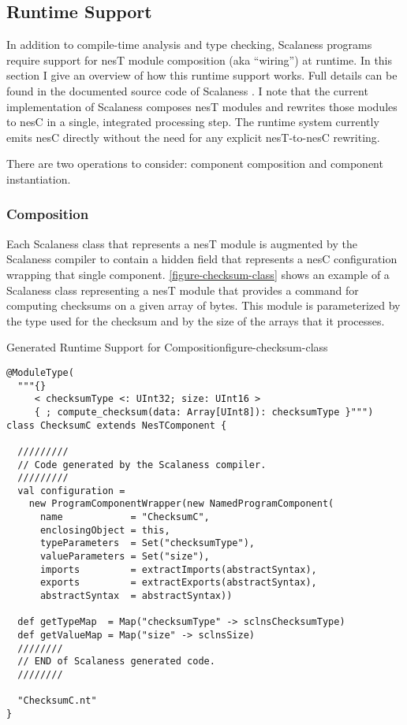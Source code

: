 
\subsection{Runtime Support}
\label{section-runtime-support}

In addition to compile-time analysis and type checking, Scalaness programs require support for
nesT module composition (aka ``wiring'') at runtime. In this section I give an overview of how
this runtime support works. Full details can be found in the documented source code of Scalaness
\cite{scalaness-home}. I note that the current implementation of Scalaness composes nesT modules
and rewrites those modules to nesC in a single, integrated processing step. The runtime system
currently emits nesC directly without the need for any explicit nesT-to-nesC rewriting.

There are two operations to consider: component composition and component instantiation.

\subsubsection{Composition}
\label{section-composition}

Each Scalaness class that represents a nesT module is augmented by the Scalaness compiler to
contain a hidden field that represents a nesC configuration wrapping that single component.
\autoref{figure-checksum-class} shows an example of a Scalaness class representing a nesT module
that provides a command for computing checksums on a given array of bytes. This module is
parameterized by the type used for the checksum and by the size of the arrays that it processes.

\singlespace
\begin{fpfig}[tbhp]{Generated Runtime Support for Composition}{figure-checksum-class}
{
\begin{lstlisting}[language=scalaness]
@ModuleType(
  """{}
     < checksumType <: UInt32; size: UInt16 >
     { ; compute_checksum(data: Array[UInt8]): checksumType }""")
class ChecksumC extends NesTComponent {

  /////////
  // Code generated by the Scalaness compiler.
  /////////
  val configuration =
    new ProgramComponentWrapper(new NamedProgramComponent(
      name            = "ChecksumC",
      enclosingObject = this,
      typeParameters  = Set("checksumType"),
      valueParameters = Set("size"),
      imports         = extractImports(abstractSyntax),
      exports         = extractExports(abstractSyntax),
      abstractSyntax  = abstractSyntax))
    
  def getTypeMap  = Map("checksumType" -> sclnsChecksumType)
  def getValueMap = Map("size" -> sclnsSize)
  ////////
  // END of Scalaness generated code.
  //////// 
           
  "ChecksumC.nt"
}
\end{lstlisting}
}
\end{fpfig}
\primaryspacing

